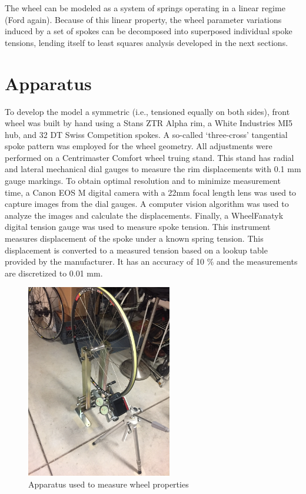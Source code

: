 \documentclass[journal]{IEEEtran}
\begin{document}
The wheel can be modeled as a system of springs operating in a linear regime (Ford again). Because of this linear property, the wheel parameter variations induced by a set of spokes can be decomposed into superposed individual spoke tensions, lending itself to least squares analysis developed in the next sections.

\section{Apparatus}
To develop the model a symmetric (i.e., tensioned equally on both sides), front wheel was built by hand using a Stans ZTR Alpha rim, a White Industries MI5 hub, and 32 DT Swiss Competition spokes.  A so-called `three-cross' tangential spoke pattern was employed for the wheel geometry.  All adjustments were performed on a Centrimaster Comfort wheel truing stand.  This stand has radial and lateral mechanical dial gauges to measure the rim displacements with 0.1 mm gauge markings. To obtain optimal resolution and to minimize measurement time, a Canon EOS M digital camera with a 22mm focal length lens was used to capture images from the dial gauges.  A computer vision algorithm was used to analyze the images and calculate the displacements.  Finally, a WheelFanatyk digital tension gauge was used to measure spoke tension. This instrument measures displacement of the spoke under a known spring tension. This displacement is converted to a measured tension based on a lookup table provided by the manufacturer. It has an accuracy of 10 \% and the measurements are discretized to 0.01 mm.

\begin{figure}[!t]
\centering
\includegraphics[width=2.5in,angle=-90]{apparatus.jpg}
\caption{Apparatus used to measure wheel properties}
\label{fig:apparatus}
\end{figure}
\end{document}
